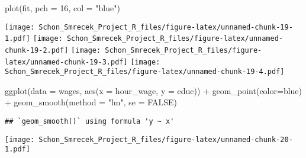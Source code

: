 \documentclass[
]{article}
\newenvironment{Shaded}{\begin{snugshade}}{\end{snugshade}}
\newcommand{\AttributeTok}[1]{\textcolor[rgb]{0.77,0.63,0.00}{#1}}
\newcommand{\ConstantTok}[1]{\textcolor[rgb]{0.00,0.00,0.00}{#1}}
\newcommand{\DecValTok}[1]{\textcolor[rgb]{0.00,0.00,0.81}{#1}}
\newcommand{\FunctionTok}[1]{\textcolor[rgb]{0.00,0.00,0.00}{#1}}
\newcommand{\NormalTok}[1]{#1}
\newcommand{\SpecialCharTok}[1]{\textcolor[rgb]{0.00,0.00,0.00}{#1}}
\newcommand{\StringTok}[1]{\textcolor[rgb]{0.31,0.60,0.02}{#1}}
\begin{document}
\begin{Shaded}
\begin{Highlighting}[]
\FunctionTok{plot}\NormalTok{(fit, }\AttributeTok{pch =} \DecValTok{16}\NormalTok{, }\AttributeTok{col =} \StringTok{"blue"}\NormalTok{)}
\end{Highlighting}
\end{Shaded}

\texttt{[image: Schon\_Smrecek\_Project\_R\_files/figure-latex/unnamed-chunk-19-1.pdf]}
\texttt{[image: Schon\_Smrecek\_Project\_R\_files/figure-latex/unnamed-chunk-19-2.pdf]}
\texttt{[image: Schon\_Smrecek\_Project\_R\_files/figure-latex/unnamed-chunk-19-3.pdf]}
\texttt{[image: Schon\_Smrecek\_Project\_R\_files/figure-latex/unnamed-chunk-19-4.pdf]}

\begin{Shaded}
\begin{Highlighting}[]
\FunctionTok{ggplot}\NormalTok{(}\AttributeTok{data =}\NormalTok{ wages, }\FunctionTok{aes}\NormalTok{(}\AttributeTok{x =}\NormalTok{ hour\_wage, }\AttributeTok{y =}\NormalTok{ educ)) }\SpecialCharTok{+} 
  \FunctionTok{geom\_point}\NormalTok{(}\AttributeTok{color=}\StringTok{\textquotesingle{}blue\textquotesingle{}}\NormalTok{) }\SpecialCharTok{+}
  \FunctionTok{geom\_smooth}\NormalTok{(}\AttributeTok{method =} \StringTok{"lm"}\NormalTok{, }\AttributeTok{se =} \ConstantTok{FALSE}\NormalTok{)}
\end{Highlighting}
\end{Shaded}

\begin{verbatim}
## `geom_smooth()` using formula 'y ~ x'
\end{verbatim}

\texttt{[image: Schon\_Smrecek\_Project\_R\_files/figure-latex/unnamed-chunk-20-1.pdf]}
\end{document}
